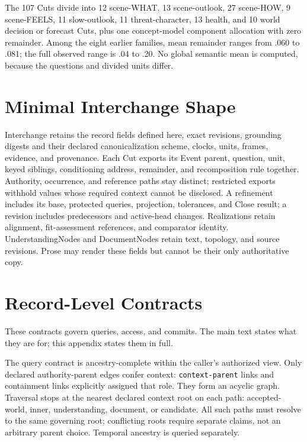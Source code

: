 \documentclass[11pt,a4paper]{article}
\begin{document}
The 107 Cuts divide into 12 scene-WHAT, 13 scene-outlook, 27 scene-HOW, 9
scene-FEELS, 11 slow-outlook, 11 threat-character, 13 health, and 10 world
decision or forecast Cuts, plus one concept-model component allocation with zero
remainder. Among the eight earlier families, mean remainder ranges from .060 to .081;
the full observed range is .04 to .20. No global semantic mean is computed,
because the questions and divided units differ.

\section{Minimal Interchange Shape}
\label{app:interchange}

Interchange retains the record fields defined here, exact revisions,
grounding digests and their declared canonicalization scheme, clocks, units, frames, evidence, and
provenance. Each Cut exports its Event parent, question, unit, keyed siblings,
conditioning address, remainder, and recomposition rule together. Authority,
occurrence, and reference paths stay distinct; restricted exports withhold
values whose required context cannot be disclosed. A refinement includes its
base, protected queries, projection, tolerances, and Close result; a revision
includes predecessors and active-head changes. Realizations retain alignment,
fit-assessment references, and comparator identity. UnderstandingNodes and
DocumentNodes retain text, topology, and source revisions. Prose may render
these fields but cannot be their only authoritative copy.

\section{Record-Level Contracts}
\label{app:record-contracts}

These contracts govern queries, access, and commits. The main text states what
they are for; this appendix states them in full.

The query contract is ancestry-complete within the caller's authorized view.
Only declared authority-parent edges confer context: \texttt{context-parent}
links and containment links explicitly assigned that role. They form an acyclic
graph. Traversal stops at the nearest declared context root on each path:
accepted-world, inner, understanding, document, or candidate. All such paths
must resolve to the same governing root; conflicting roots require separate
claims, not an arbitrary parent choice. Temporal ancestry is queried separately.
\end{document}
